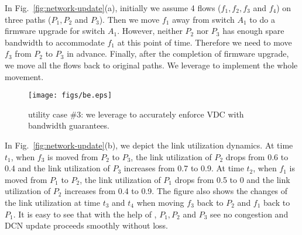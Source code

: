 In Fig.~\ref{fig:network-update}(a), initially we assume 4 flows ($f_1, f_2, f_3$ and $f_4$) on three paths ($P_1, P_2$ and $P_3$). Then we move $f_1$ away from switch $A_1$ to do a firmware upgrade for switch $A_1$. However, neither $P_2$ nor $P_3$ has enough spare bandwidth to accommodate $f_1$ at this point of time. Therefore we need to move $f_3$ from $P_2$ to $P_3$ in advance. Finally, after the completion of firmware upgrade, we move all the flows back to original paths. We leverage \sys to implement the whole movement.

\begin{figure}[t]
\centering
\texttt{[image: figs/be.eps]}
\caption{\sys utility case $\#3$: we leverage \sys to accurately enforce VDC with bandwidth guarantees.}
\label{fig:bandwidth_enforcement}
\vspace{-0.2in}
\end{figure}

In Fig.~\ref{fig:network-update}(b), we depict the link utilization dynamics. At time $t_1$, when $f_3$ is moved from $P_2$ to $P_3$, the link utilization of $P_2$ drops from 0.6 to 0.4 and the link utilization of $P_3$ increases from 0.7 to 0.9. At time $t_2$, when $f_1$ is moved from $P_1$ to $P_2$, the link utilization of $P_1$ drops from 0.5 to 0 and the link utilization of $P_2$ increases from 0.4 to 0.9. The figure also shows the changes of the link utilization at time $t_3$ and $t_4$ when moving $f_3$ back to $P_2$ and $f_1$ back to $P_1$. It is easy to see that with the help of \sys, $P_1, P_2$ and $P_3$ see no congestion and DCN update proceeds smoothly without loss.


